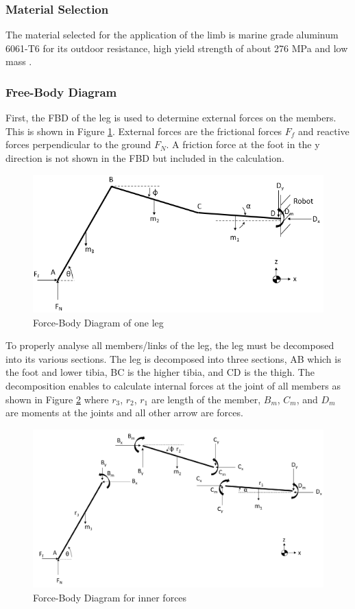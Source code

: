 \subsubsection{Material Selection}
The material selected for the application of the limb is marine grade aluminum 6061-T6 for its outdoor resistance, high yield strength of about 276 MPa and low mass \cite{matweb_aluminum_nodate}.

\subsubsection{Free-Body Diagram}
First, the FBD of the leg is used to determine external forces on the members. This is shown in Figure \ref{fig:fbd_leg}. External forces are the frictional forces $F_f$ and reactive forces perpendicular to the ground $F_N$. A friction force at the foot in the y direction is not shown in the FBD but included in the calculation.
\begin{figure}
    \centering
    \includegraphics[width=\textwidth]{4_Analysis/img/Limbs/Leg_FBD.PNG}
    \caption{Force-Body Diagram of one leg}
    \label{fig:fbd_leg}
\end{figure}

To properly analyse all members/links of the leg, the leg must be decomposed into its various sections. The leg is decomposed into three sections, AB which is the foot and lower tibia, BC is the higher tibia, and CD is the thigh. The decomposition enables to calculate internal forces at the joint of all members as shown in Figure \ref{fig:fbd_leg_section} where $r_3$, $r_2$, $r_1$ are length of the member, $B_m$, $C_m$, and $D_m$ are moments at the joints and all other arrow are forces.

\begin{figure}
    \centering
    \includegraphics[width=\textwidth]{4_Analysis/img/Limbs/Leg_Decomposed.PNG}
    \caption{Force-Body Diagram for inner forces}
    \label{fig:fbd_leg_section}
\end{figure}
